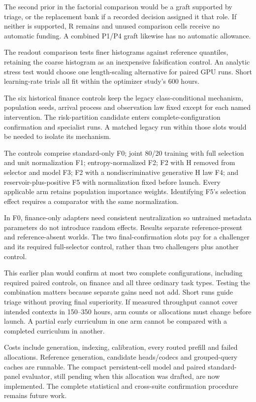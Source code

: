 \documentclass[11pt]{article}
\begin{document}
The second prior in the factorial comparison would be a graft supported by triage, or the replacement bank if a recorded decision assigned it that role. If neither is supported, R remains and unused comparison cells receive no automatic funding. A combined P1/P4 graft likewise has no automatic allowance.

The readout comparison tests finer histograms against reference quantiles, retaining the coarse histogram as an inexpensive falsification control. An analytic stress test would choose one length-scaling alternative for paired GPU runs. Short learning-rate trials all fit within the optimizer study's 600 hours.

The six historical finance controls keep the legacy class-conditional mechanism, population seeds, arrival process and observation law fixed except for each named intervention. The risk-partition candidate enters complete-configuration confirmation and specialist runs. A matched legacy run within those slots would be needed to isolate its mechanism.

The controls comprise standard-only F0; joint 80/20 training with full selection and unit normalization F1; entropy-normalized F2; F2 with H removed from selector and model F3; F2 with a nondiscriminative generative H law F4; and reservoir-plus-positive F5 with normalization fixed before launch. Every applicable arm retains population importance weights. Identifying F5's selection effect requires a comparator with the same normalization.

In F0, finance-only adapters need consistent neutralization so untrained metadata parameters do not introduce random effects. Results separate reference-present and reference-absent worlds. The two final-confirmation slots pay for a challenger and its required full-selector control, rather than two challengers plus another control.

This earlier plan would confirm at most two complete configurations, including required paired controls, on finance and all three ordinary task types. Testing the combination matters because separate gains need not add. Short runs guide triage without proving final superiority. If measured throughput cannot cover intended contexts in 150--350 hours, arm counts or allocations must change before launch. A partial early curriculum in one arm cannot be compared with a completed curriculum in another.

Costs include generation, indexing, calibration, every routed prefill and failed allocations. Reference generation, candidate heads/codecs and grouped-query caches are runnable. The compact persistent-cell model and paired standard-panel evaluator, still pending when this allocation was drafted, are now implemented. The complete statistical and cross-suite confirmation procedure remains future work.
\end{document}
